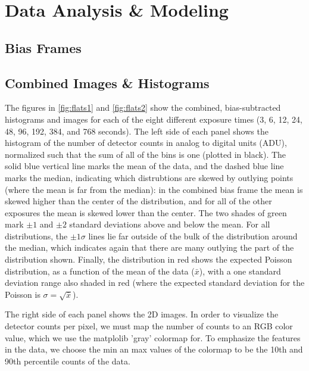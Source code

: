 \documentclass[onecolumn]{aastex62}
\begin{document}
\section{Data Analysis \& Modeling}
\subsection{Bias Frames}

\subsection{Combined Images \& Histograms}
The figures in \ref{fig:flats1} and \ref{fig:flats2} show the combined, bias-subtracted histograms and images for each of the eight different exposure times (3, 6, 12, 24, 48, 96, 192, 384, and 768 seconds). The left side of each panel shows the histogram of the number of detector counts in analog to digital units (ADU), normalized such that the sum of all of the bins is one (plotted in black). The solid blue vertical line marks the mean of the data, and the dashed blue line marks the median, indicating which distrubtions are skewed by outlying points (where the mean is far from the median): in the combined bias frame the mean is skewed higher than the center of the distribution, and for all of the other exposures the mean is skewed lower than the center. The two shades of green mark $\pm1$ and $\pm2$ standard deviations above and below the mean. For all distributions, the $\pm1\sigma$ lines lie far outside of the bulk of the distribution around the median, which indicates again that there are many outlying the part of the distribution shown. Finally, the distribution in red shows the expected Poisson distribution, as a function of the mean of the data ($\bar{x}$), with a one standard deviation range also shaded in red (where the expected standard deviation for the Poisson is $\sigma=\sqrt{\bar{x}}$).  

The right side of each panel shows the 2D images. In order to visualize the detector counts per pixel, we must map the number of counts to an RGB color value, which we use the matplolib 'gray' colormap for. To emphasize the features in the data, we choose the min an max values of the colormap to be the 10th and 90th percentile counts of the data.
\end{document}

